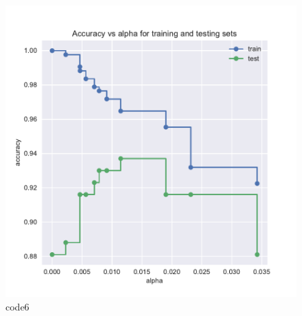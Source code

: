 \begin{figure}[htbp]
	\centering
	\includegraphics[width=14cm]{codeimage/code6}
	\caption{code6}
	\label{code6}
\end{figure}
